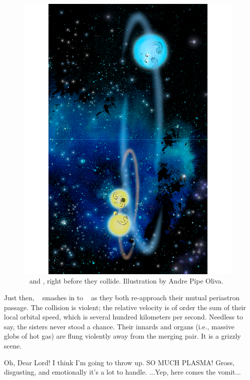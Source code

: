 \documentclass[main.tex]{subfiles}
\begin{document}
\begin{figure}
\includegraphics[width=\columnwidth,angle=270,origin=c]{ch3_2.pdf}
\caption{\rmtaygete~ and \rmalcyone, right before they collide.  Illustration by Andre Pipe Oliva.
\label{fig:fig1}}
\end{figure}

\par \nar Just then, \rmtaygete~ smashes in to \rmalcyone~ as they both re-approach their mutual periastron passage.  The collision is violent; the relative velocity is of order the sum of their local orbital speed, which is several hundred kilometers per second.  Needless to say, the sisters never stood a chance.  Their innards and organs (i.e., massive globs of hot gas) are flung violently away from the merging pair.  It is a grizzly scene.

\par \Celaeno Oh, Dear Lord!  I think I'm going to throw up.  SO MUCH PLASMA!  Gross, disgusting, and emotionally it's a lot to handle. ...Yep, here comes the vomit...
\end{document}
